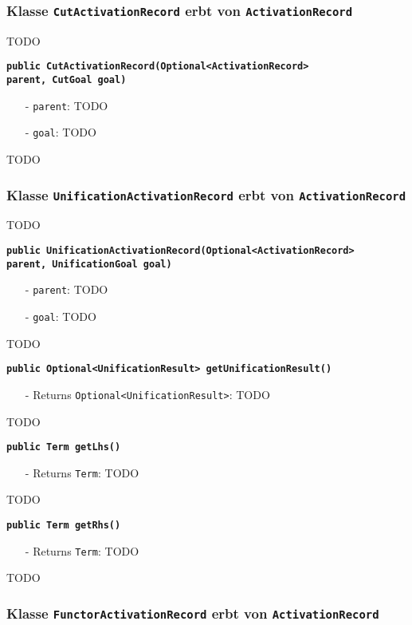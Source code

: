 \documentclass[parskip=full,11pt,twoside]{scrartcl}
\begin{document}
\subsubsection{Klasse \texttt{CutActivationRecord} erbt von \texttt{ActivationRecord}}
TODO

\textbf{\texttt{public CutActivationRecord(Optional<ActivationRecord>\\ parent, CutGoal goal)}}
\begin{itemize}[noitemsep]
	\item[-] \texttt{parent}: TODO
	\item[-] \texttt{goal}: TODO
\end{itemize}
TODO

\subsubsection{Klasse \texttt{UnificationActivationRecord} erbt von \texttt{ActivationRecord}}
TODO

\textbf{\texttt{public UnificationActivationRecord(Optional<ActivationRecord>\\ parent, UnificationGoal goal)}}
\begin{itemize}[noitemsep]
	\item[-] \texttt{parent}: TODO
	\item[-] \texttt{goal}: TODO
\end{itemize}
TODO

\textbf{\texttt{public Optional<UnificationResult> getUnificationResult()}}
\begin{itemize}[noitemsep]
	\item[-] Returns \texttt{Optional<UnificationResult>}: TODO
\end{itemize}
TODO

\textbf{\texttt{public Term getLhs()}}
\begin{itemize}[noitemsep]
	\item[-] Returns \texttt{Term}: TODO
\end{itemize}
TODO

\textbf{\texttt{public Term getRhs()}}
\begin{itemize}[noitemsep]
	\item[-] Returns \texttt{Term}: TODO
\end{itemize}
TODO

\subsubsection{Klasse \texttt{FunctorActivationRecord} erbt von \texttt{ActivationRecord}}
\end{document}
